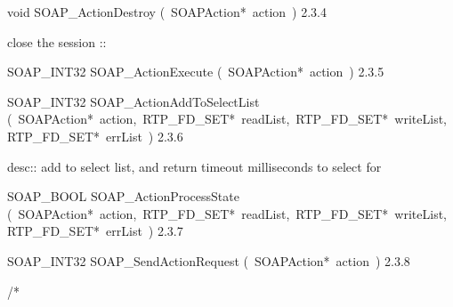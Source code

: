 \documentclass{article}
\begin{document}
\begin{cxxentry}
\begin{cxxentry}
\begin{cxxfunction}
\begin{cxxdoc}
\end{cxxdoc}
\end{cxxfunction}
\begin{cxxfunction}
{void}
        {SOAP\_ActionDestroy}
        {(\ SOAPAction*\ action\ )}
        {}
        {2.3.4}
\begin{cxxdoc}
close the session ::

\end{cxxdoc}
\end{cxxfunction}
\begin{cxxfunction}
{SOAP\_INT32}
        {SOAP\_ActionExecute}
        {(\ SOAPAction*\ action\ )}
        {}
        {2.3.5}
\end{cxxfunction}
\begin{cxxfunction}
{SOAP\_INT32}
        {SOAP\_ActionAddToSelectList}
        {(\ SOAPAction*\ action,\ RTP\_FD\_SET*\ readList,\ RTP\_FD\_SET*\ writeList,\ RTP\_FD\_SET*\ errList\ )}
        {}
        {2.3.6}
\begin{cxxdoc}
desc:: add to select list, and return timeout milliseconds to select for

\end{cxxdoc}
\end{cxxfunction}
\begin{cxxfunction}
{SOAP\_BOOL}
        {SOAP\_ActionProcessState}
        {(\ SOAPAction*\ action,\ RTP\_FD\_SET*\ readList,\ RTP\_FD\_SET*\ writeList,\ RTP\_FD\_SET*\ errList\ )}
        {}
        {2.3.7}
\end{cxxfunction}
\begin{cxxfunction}
{SOAP\_INT32}
        {SOAP\_SendActionRequest}
        {(\ SOAPAction*\ action\ )}
        {}
        {2.3.8}
\begin{cxxdoc}
/*


\end{cxxdoc}
\end{cxxfunction}
\end{cxxentry}
\end{cxxentry}
\end{document}
